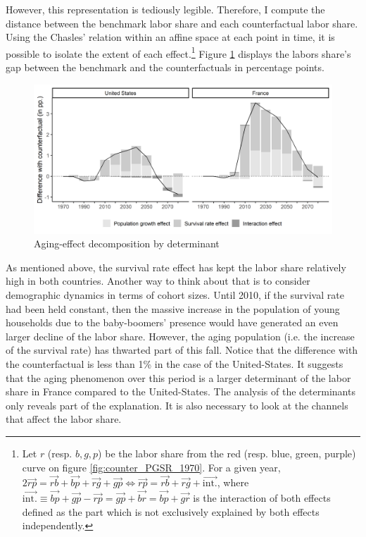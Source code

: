 However, this representation is tediously legible. Therefore, I compute the distance between the benchmark labor share and each counterfactual labor share. Using the Chasles' relation within an affine space at each point in time, it is possible to isolate the extent of each effect.\footnote{Let $r$ (resp. $b, g, p$) be the labor share from the red (resp. blue, green, purple) curve on figure \ref{fig:counter_PGSR_1970}. For a given year, $2\vec{rp} = \vec{rb} + \vec{bp} + \vec{rg} + \vec{gp} \Leftrightarrow \vec{rp} = \vec{rb} + \vec{rg} + \vec{\text{int.}}$, where $\vec{\text{int.}} \equiv \vec{bp} + \vec{gp} - \vec{rp} = \vec{gp} +\vec{br} = \vec{bp} + \vec{gr}$ is the interaction of both effects defined as the part which is not exclusively explained by both effects independently.} Figure \ref{fig:decomp_PGSR} displays the labors share's gap between the benchmark and the counterfactuals in percentage points.
\begin{figure}[tb]
	\centering
	\caption{Aging-effect decomposition by determinant} \label{fig:decomp_PGSR}
	\includegraphics[width=1\linewidth]{../result/decomposition/decomp_PGSR.png}
\end{figure}
As mentioned above, the survival rate effect has kept the labor share relatively high in both countries. Another way to think about that is to consider demographic dynamics in terms of cohort sizes. Until 2010, if the survival rate had been held constant, then the massive increase in the population of young households due to the baby-boomers' presence would have generated an even larger decline of the labor share. However, the aging population (i.e. the increase of the survival rate) has thwarted part of this fall. Notice that the difference with the counterfactual is less than 1\% in the case of the United-States. It suggests that the aging phenomenon over this period is a larger determinant of the labor share in France compared to the United-States.
The analysis of the determinants only reveals part of the explanation. It is also necessary to look at the channels that affect the labor share.

